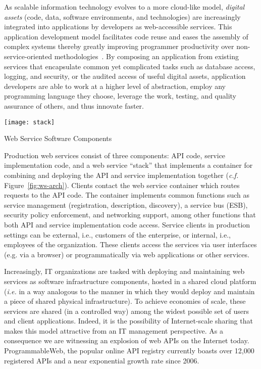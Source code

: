 As scalable information technology evolves to a more cloud-like model,
{\em digital assets} (code, data, software environments, and technologies) 
are increasingly integrated into applications by developers 
as web-accessible services.
This application development model facilitates code reuse and eases the 
assembly of complex systems thereby greatly improving programmer productivity
over non-service-oriented methodologies~\cite{Dan:2008:SSR:1370916.1370923}. 
By composing an application from existing services that 
encapsulate common yet complicated tasks such as
database access, logging, and security, or the audited access of useful 
digital assets, application developers are able  
to work at a higher level of abstraction, employ any programming 
language they choose, leverage the work, testing, and quality
assurance of others, and thus innovate faster.  

\begin{floatingfigure}[rb]{2.8in}
\vspace{-0.1in}
\texttt{[image: stack]}
\vspace{-0.08in}
\caption{Web Service Software Components\label{fig:ws-arch}}
\end{floatingfigure}
Production web services consist of three components: API code, service
implementation code, and a web service ``stack'' that implements a container
for combining and deploying the API and service implementation
together ({\em c.f.} Figure~\ref{fig:ws-arch}).
Clients contact the web service container which routes requests to the
API code.  The container implements common functions such as 
service management (registration, description, discovery), a service
bus (ESB), security policy enforcement, and networking support, among other 
functions that both API and service implementation code access.
Service clients in production settings can be 
external, i.e., customers of the enterprise, or internal, i.e., employees of 
the organization.  These clients access the services via user 
interfaces (e.g. via a browser) or programmatically via web applications 
or other services. 

Increasingly, IT organizations are tasked with deploying and 
maintaining web services as software infrastructure components, hosted in a
shared cloud platform ({\em i.e.} in a way analogous to the manner in which they
would deploy and maintain a piece of shared physical infrastructure).  
To achieve economies of scale, these services are shared (in a controlled
way) among the widest possible set of users and client applications.  Indeed,
it is the possibility of Internet-scale sharing that makes this model
attractive from an IT management perspective. As a consequence we 
are witnessing an explosion of web APIs on the Internet today. ProgrammableWeb,
the popular online API registry currently boasts over 12,000 registered APIs and
a near exponential growth rate since 2006.

